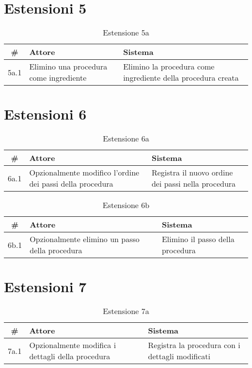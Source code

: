 \section*{Estensioni 5}
\begin{table}[H]\centering\caption*{Estensione 5a}
      \small
      \begin{tabular}{|c|p{7cm}|p{6.24cm}|}
            \hline\bfseries \# & \bfseries Attore                       & \bfseries Sistema                                            \\\hline
            5a.1               & Elimino una procedura come ingrediente & Elimino la procedura come ingrediente della procedura creata \\\hline
      \end{tabular}
\end{table}

\section*{Estensioni 6}
\begin{table}[H]\centering\caption*{Estensione 6a}
      \small
      \begin{tabular}{|c|p{7cm}|p{6.24cm}|}
            \hline\bfseries \# & \bfseries Attore                                          & \bfseries Sistema                                  \\\hline
            6a.1               & Opzionalmente modifico l’ordine dei passi della procedura & Registra il nuovo ordine dei passi nella procedura \\\hline
      \end{tabular}
\end{table}

\begin{table}[H]\centering\caption*{Estensione 6b}
      \small
      \begin{tabular}{|c|p{7cm}|p{6.24cm}|}
            \hline\bfseries \# & \bfseries Attore                               & \bfseries Sistema                \\\hline
            6b.1               & Opzionalmente elimino un passo della procedura & Elimino il passo della procedura \\\hline
      \end{tabular}
\end{table}

\section*{Estensioni 7}
\begin{table}[H]\centering\caption*{Estensione 7a}
      \small
      \begin{tabular}{|c|p{7cm}|p{6.24cm}|}
            \hline\bfseries \# & \bfseries Attore                                  & \bfseries Sistema                               \\\hline
            7a.1               & Opzionalmente modifica i dettagli della procedura & Registra la procedura con i dettagli modificati \\\hline
      \end{tabular}
\end{table}

